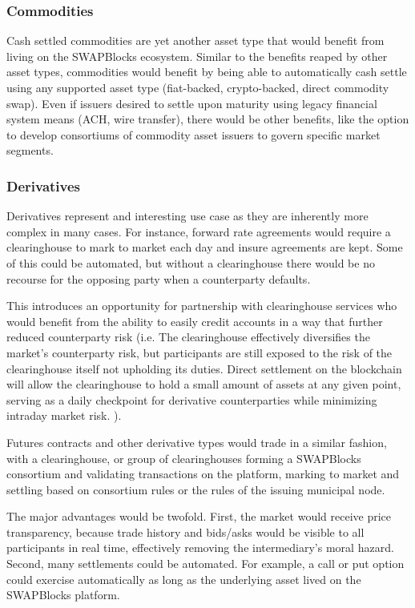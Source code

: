 \documentclass[12pt]{article}
\begin{document}
\subsubsection{Commodities}
Cash settled commodities are yet another asset type that would benefit from living on the SWAPBlocks ecosystem. 
Similar to the benefits reaped by other asset types, commodities would benefit by being able to automatically cash 
settle using any supported asset type (fiat-backed, crypto-backed, direct commodity swap). Even if issuers desired 
to settle upon maturity using legacy financial system means (ACH, wire transfer), there would be other benefits, 
like the option to develop consortiums of commodity asset issuers to govern specific market segments.

\subsubsection{Derivatives}
Derivatives represent and interesting use case as they are inherently more complex in many cases. For instance, 
forward rate agreements would require a clearinghouse to mark to market each day and insure agreements are kept. Some 
of this could be automated, but without a clearinghouse there would be no recourse for the opposing party when a 
counterparty defaults.


This introduces an opportunity for partnership with clearinghouse services who would benefit from the ability to easily 
credit accounts in a way that further reduced counterparty risk (i.e. The clearinghouse effectively diversifies the 
market’s counterparty risk, but participants are still exposed to the risk of the clearinghouse itself not 
upholding its duties.  Direct settlement on the blockchain will allow the clearinghouse to hold a small amount of assets
at any given point, serving as a daily checkpoint for derivative counterparties while minimizing intraday market risk.
).

Futures contracts and other derivative types would trade in a similar fashion, with a clearinghouse, or group of 
clearinghouses forming a SWAPBlocks consortium and validating transactions on the platform, marking to market and settling based on consortium rules or the rules of the issuing municipal node.

The major advantages would be twofold. First, the market would receive price transparency, because trade history 
and bids/asks would be visible to all participants in real time, effectively removing the intermediary’s moral 
hazard. Second, many settlements could be automated. For example, a call or put option could exercise automatically 
as long as the underlying asset lived on the SWAPBlocks platform.
\end{document}

